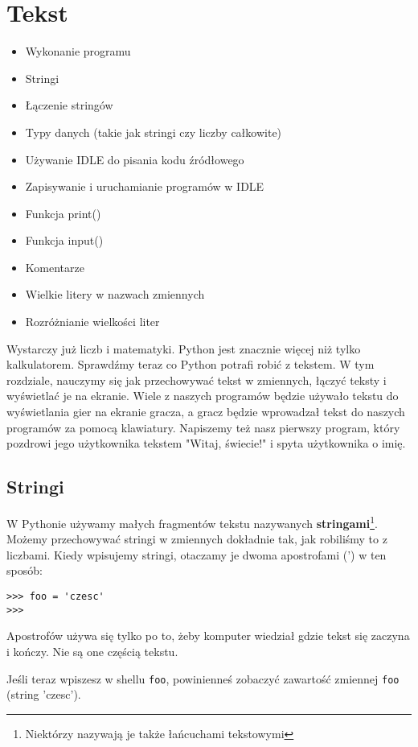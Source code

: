 \documentclass{book}
\newcommand{\btopicscovered}{
	\begin{graybox}
	\begin{itemize}
}
\newcommand{\etopicscovered}{
	\end{itemize}
	\end{graybox}
}
\begin{document}
\chapter{Tekst}

\btopicscovered
	\item Wykonanie programu
	\item Stringi
	\item Łączenie stringów
	\item Typy danych (takie jak stringi czy liczby całkowite)
	\item Używanie IDLE do pisania kodu źródłowego
	\item Zapisywanie i uruchamianie programów w IDLE
	\item Funkcja print()
	\item Funkcja input()
	\item Komentarze
	\item Wielkie litery w nazwach zmiennych
	\item Rozróżnianie wielkości liter
\etopicscovered

Wystarczy już liczb i matematyki. Python jest znacznie więcej niż tylko kalkulatorem. Sprawdźmy teraz co Python potrafi robić z tekstem. W tym rozdziale, nauczymy się jak przechowywać tekst w zmiennych, łączyć teksty i wyświetlać je na ekranie. Wiele z naszych programów będzie używało tekstu do wyświetlania gier na ekranie gracza, a gracz będzie wprowadzał tekst do naszych programów za pomocą klawiatury. Napiszemy też nasz pierwszy program, który pozdrowi jego użytkownika tekstem "Witaj, świecie!" i spyta użytkownika o imię.

\section{Stringi}

W Pythonie używamy małych fragmentów tekstu nazywanych {\bf stringami}\footnote{Niektórzy nazywają je także łańcuchami tekstowymi}. Możemy przechowywać stringi w zmiennych dokładnie tak, jak robiliśmy to z liczbami. Kiedy wpisujemy stringi, otaczamy je dwoma apostrofami (') w ten sposób:

\begin{lstlisting}
>>> foo = 'czesc'
>>>
\end{lstlisting}

Apostrofów używa się tylko po to, żeby komputer wiedział gdzie tekst się zaczyna i kończy. Nie są one częścią tekstu.

Jeśli teraz wpiszesz w shellu \lstinline{foo}, powinienneś zobaczyć zawartość zmiennej \lstinline{foo} (string 'czesc'). 
\end{document}
